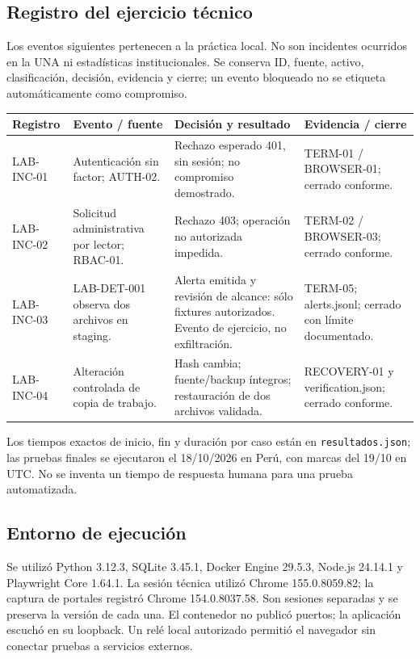 \documentclass[10pt,a4paper]{article}
\newcommand{\archivo}[1]{{\ttfamily\nolinkurl{#1}}}
\newcommand{\cabecera}[1]{\textbf{#1}}
\begin{document}
\subsection*{Registro del ejercicio técnico}
Los eventos siguientes pertenecen a la práctica local. No son incidentes ocurridos en la UNA ni estadísticas institucionales. Se conserva ID, fuente, activo, clasificación, decisión, evidencia y cierre; un evento bloqueado no se etiqueta automáticamente como compromiso.
\begin{TablaCompacta}
\begin{longtable}{P{20mm}P{42mm}P{60mm}P{37mm}}
\toprule\cabecera{Registro} & \cabecera{Evento / fuente} & \cabecera{Decisión y resultado} & \cabecera{Evidencia / cierre}\\\midrule\endhead
LAB-INC-01 & Autenticación sin factor; AUTH-02. & Rechazo esperado 401, sin sesión; no compromiso demostrado. & TERM-01 / BROWSER-01; cerrado conforme.\\
LAB-INC-02 & Solicitud administrativa por lector; RBAC-01. & Rechazo 403; operación no autorizada impedida. & TERM-02 / BROWSER-03; cerrado conforme.\\
LAB-INC-03 & LAB-DET-001 observa dos archivos en staging. & Alerta emitida y revisión de alcance: sólo fixtures autorizados. Evento de ejercicio, no exfiltración. & TERM-05; alerts.jsonl; cerrado con límite documentado.\\
LAB-INC-04 & Alteración controlada de copia de trabajo. & Hash cambia; fuente/backup íntegros; restauración de dos archivos validada. & RECOVERY-01 y verification.json; cerrado conforme.\\\bottomrule
\end{longtable}
\end{TablaCompacta}
Los tiempos exactos de inicio, fin y duración por caso están en \archivo{resultados.json}; las pruebas finales se ejecutaron el 18/10/2026 en Perú, con marcas del 19/10 en UTC. No se inventa un tiempo de respuesta humana para una prueba automatizada.

\subsection*{Entorno de ejecución}
Se utilizó Python 3.12.3, SQLite 3.45.1, Docker Engine 29.5.3, Node.js 24.14.1 y Playwright Core 1.64.1. La sesión técnica utilizó Chrome 155.0.8059.82; la captura de portales registró Chrome 154.0.8037.58. Son sesiones separadas y se preserva la versión de cada una. El contenedor no publicó puertos; la aplicación escuchó en su loopback. Un relé local autorizado permitió el navegador sin conectar pruebas a servicios externos.
\end{document}
